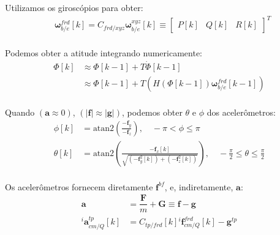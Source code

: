 Utilizamos os giroscópios para obter:
\begin{align*}
     &\mathbf{\omega}^{frd}_{b/e}{\left[k\right]}
     = C_{frd/xyz} \mathbf{\omega}^{xyz}_{b/e}{\left[k\right]}
        \equiv \begin{bmatrix} P{\left[k\right]} & Q{\left[k\right]} & R{\left[k\right]} \end{bmatrix}^{T}
        \text{} \\
\end{align*}

Podemos obter a atitude integrando numericamente:
\begin{align*}
{\Phi}{\left[ k \right]}
    &\approx {\Phi} {\left[ k-1 \right]} + T {\dot{\Phi}{\left[ k -1 \right]}} \\
    &\approx {\Phi} {\left[ k-1 \right]} + T {\left( H {\left( \Phi{\left[ k-1 \right]} \right)}{\mathbf{\omega}^{frd}_{b/e}}{\left[ k-1 \right]}\right)} \\
\end{align*}

Quando \((\mathbf{a} \approx 0)\), \((\lvert\mathbf{f}\lvert \approx \lvert\mathbf{g}\lvert)\), podemos obter \(\theta\) e \(\phi\) dos acelerômetros:
\begin{align*}
    {\phi}\left[k\right] &=  \textrm{atan2}\left(\frac{\mathbf{-f}_{y}}{\mathbf{-f}_{z}}\right),\quad
    -\pi  < \phi \leq \pi \\
    {{\theta}{\left[k\right]}} &= \textrm{atan2} \left( {\frac{-\mathbf{f}_{x}\left[k\right] }{ \sqrt{ {\left({{-\mathbf{f}_{y}^{2}}\left[k\right]}\right)} + {\left({{-\mathbf{f}}_{z}^{2}}{\left[k\right]}\right)}}}} \right), \quad -\frac{\pi}{2} \leq \theta \leq \frac{\pi}{2} \\
\end{align*}

Os acelerômetros fornecem diretamente \(\mathbf{f}^{bf}\), e, indiretamente, \(\mathbf{a}\):
\begin{align*}
    \mathbf{a} &= \dfrac{\mathbf{F}}{m} + \mathbf{G} \equiv \mathbf{f} - \mathbf{g} \\
{^{i}\mathbf{a}^{tp}_{cm/Q}\left[k\right]} &= C_{tp/frd}\left[k\right]{^{i}\mathbf{f}^{frd}_{cm/Q}\left[k\right]} - \mathbf{g}^{tp} \\
\end{align*}

